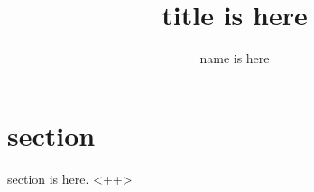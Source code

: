 \documentclass[10pt]{jarticle}
\title{title is here}
\author{name is here}
\begin{document}
\maketitle

\section{section}
section is here.
<++>


\end{document}
